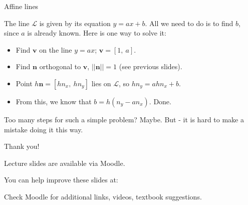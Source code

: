\documentclass{beamer}
\begin{document}
\begin{frame}{Affine lines}
	\begin{flushleft}
		
		The line $\mathcal{L}$ is given by its equation $y = ax +b$. All we need to do is to find $b$, since $a$ is already known. Here is one way to solve it:
		
		\bigskip
		
		\begin{itemize}
			\item Find $\mathbf v$ on the line $y = ax$; $\mathbf v = [1, \ a]$.
			\item Find $\mathbf n$ orthogonal to $\mathbf v$, $||\mathbf n|| = 1$ (see previous slides).
			\item Point $h \mathbf n = [h n_x, \ h n_y]$ lies on $\mathcal{L}$, so $h n_y = a h n_x + b$.
			\item From this, we know that $b = h(n_y - a n_x)$. Done.
		\end{itemize}
		
		\bigskip
		
		Too many steps for such a simple problem? Maybe. But - it is hard to make a mistake doing it this way.
		
	\end{flushleft}
\end{frame}




%
%
%
%



\begin{frame}{Thank you!}
\centerline{Lecture slides are available via Moodle.}
\bigskip
\centerline{You can help improve these slides at:}
\centerline{\mygit}
\bigskip
\centerline{Check Moodle for additional links, videos, textbook suggestions.}
\bigskip

\centerline{\textcolor{black}{}}

\end{frame}
\end{document}
